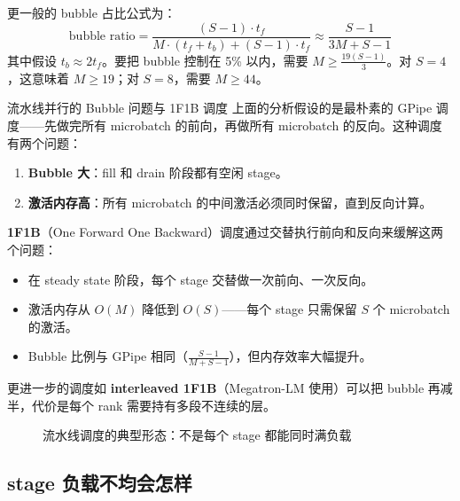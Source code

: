 更一般的 bubble 占比公式为：
$$
\text{bubble ratio} = \frac{(S - 1) \cdot t_f}{M \cdot (t_f + t_b) + (S-1) \cdot t_f} \approx \frac{S-1}{3M + S - 1}
$$
其中假设 $t_b \approx 2t_f$。要把 bubble 控制在 5\% 以内，需要 $M \geq \frac{19(S-1)}{3}$。对 $S=4$，这意味着 $M \geq 19$；对 $S=8$，需要 $M \geq 44$。

\begin{warningbox}{流水线并行的 Bubble 问题与 1F1B 调度}
上面的分析假设的是最朴素的 GPipe 调度——先做完所有 microbatch 的前向，再做所有 microbatch 的反向。这种调度有两个问题：
\begin{enumerate}
    \item \textbf{Bubble 大}：fill 和 drain 阶段都有空闲 stage。
    \item \textbf{激活内存高}：所有 microbatch 的中间激活必须同时保留，直到反向计算。
\end{enumerate}

\textbf{1F1B}（One Forward One Backward）调度通过交替执行前向和反向来缓解这两个问题：
\begin{itemize}
    \item 在 steady state 阶段，每个 stage 交替做一次前向、一次反向。
    \item 激活内存从 $O(M)$ 降低到 $O(S)$——每个 stage 只需保留 $S$ 个 microbatch 的激活。
    \item Bubble 比例与 GPipe 相同（$\frac{S-1}{M+S-1}$），但内存效率大幅提升。
\end{itemize}
更进一步的调度如 \textbf{interleaved 1F1B}（Megatron-LM 使用）可以把 bubble 再减半，代价是每个 rank 需要持有多段不连续的层。
\end{warningbox}

\begin{figure}[H]
\centering
{}
\caption{流水线调度的典型形态：不是每个 stage 都能同时满负载}
\end{figure}

\subsection{stage 负载不均会怎样}

